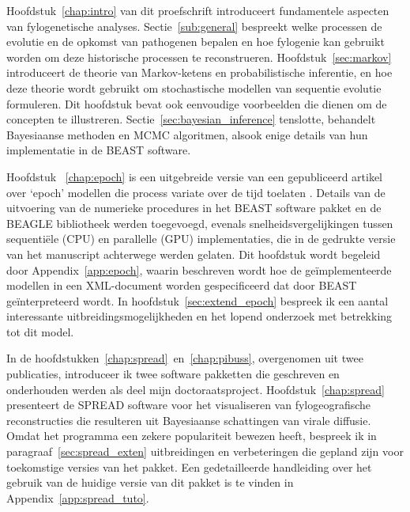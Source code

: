 {Hoofdstuk~\ref {chap:intro} van dit proefschrift introduceert fundamentele aspecten van fylogenetische analyses.
Sectie~\ref{sub:general} bespreekt welke processen de evolutie en de opkomst van pathogenen bepalen en hoe fylogenie kan gebruikt worden om deze historische processen te reconstrueren.
Hoofdstuk~\ref{sec:markov} introduceert de theorie van Markov-ketens en probabilistische inferentie, en hoe deze theorie wordt gebruikt om stochastische modellen van sequentie evolutie formuleren.
Dit hoofdstuk bevat ook eenvoudige voorbeelden die dienen om de concepten te illustreren.
Sectie~\ref{sec:bayesian_inference} tenslotte, behandelt Bayesiaanse methoden en MCMC algoritmen, alsook enige details van hun implementatie in de BEAST software.

Hoofdstuk ~\ref{chap:epoch} is een uitgebreide versie van een gepubliceerd artikel over `epoch' modellen die process variate over de tijd toelaten \citep{Bielejec2014a}.
Details van de uitvoering van de numerieke procedures in het BEAST software pakket en de BEAGLE bibliotheek werden toegevoegd, evenals snelheidsvergelijkingen tussen sequenti\"ele (CPU) en parallelle (GPU) implementaties, die in de gedrukte versie van het manuscript achterwege werden gelaten.
Dit hoofdstuk wordt begeleid door Appendix~\ref{app:epoch}, waarin beschreven wordt hoe de ge\"implementeerde modellen in een XML-document worden gespecificeerd dat door BEAST ge\"interpreteerd wordt.
In hoofdstuk~\ref{sec:extend_epoch} bespreek ik een aantal interessante uitbreidingsmogelijkheden en het lopend onderzoek met betrekking tot dit model.

In de hoofdstukken~\ref{chap:spread}~en~\ref{chap:pibuss}, overgenomen uit twee publicaties, introduceer ik twee software pakketten die geschreven en onderhouden werden als deel mijn doctoraatsproject.
Hoofdstuk~\ref{chap:spread} presenteert de SPREAD software voor het visualiseren van fylogeografische reconstructies die resulteren uit Bayesiaanse schattingen van virale diffusie.
Omdat het programma een zekere populariteit bewezen heeft, bespreek ik in paragraaf~\ref{sec:spread_exten} uitbreidingen en verbeteringen die  gepland zijn voor toekomstige versies van het pakket.
Een gedetailleerde handleiding over het gebruik van de huidige versie van dit pakket is te vinden in Appendix~\ref{app:spread_tuto}.

}
